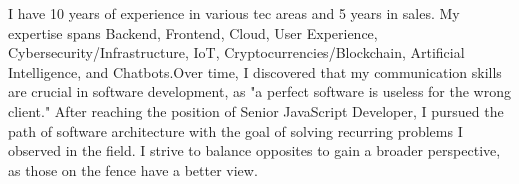 

\begin{cvparagraph}

\vspace{2mm}

I have 10 years of experience in various tec areas and 5 years in sales. My expertise spans Backend, Frontend, Cloud, User Experience, Cybersecurity/Infrastructure, IoT, Cryptocurrencies/Blockchain, Artificial Intelligence, and Chatbots.Over time, I discovered that my communication skills are crucial in software development, as "a perfect software is useless for the wrong client." After reaching the position of Senior JavaScript Developer, I pursued the path of software architecture with the goal of solving recurring problems I observed in the field. I strive to balance opposites to gain a broader perspective, as those on the fence have a better view.


    
\end{cvparagraph}
